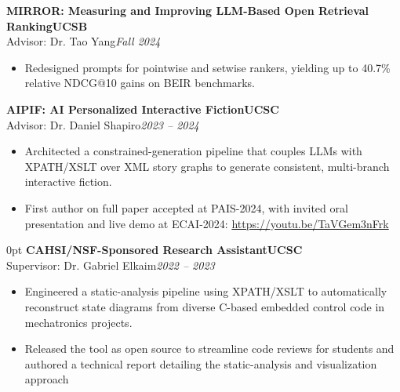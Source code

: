 \documentclass[11pt]{article}
\newlength{\sectionwidth}
\newcommand{\CVSection}[2]{%
  \vspace{1.4em} 
  \noindent
  \makebox[0pt][l]{%
    \parbox[t]{\sectionwidth}{%
      \raggedright\scshape\bfseries\small #1%
    }%
  }%
  \begin{adjustwidth}{\sectionwidth}{0pt}
    #2
  \end{adjustwidth}
}
\newcommand{\CVEntry}[4]{%
  \vspace{0.4em} %
  {\bfseries #1}\hfill {\bfseries #2}\\[0.1em] 
  #3\hfill \textit{#4}
}
\begin{document}
{\begin{itemize}
  \end{itemize}
  \vspace{0.4em}
\CVEntry
    {MIRROR: Measuring and Improving LLM-Based Open Retrieval Ranking}
    {UCSB}
    {Advisor: Dr. Tao Yang}
    {Fall 2024}
  \begin{itemize}
    \item Redesigned prompts for pointwise and setwise rankers, yielding up to 40.7\% relative NDCG@10 gains on BEIR benchmarks.
  \end{itemize}
  \vspace{0.4em}
\CVEntry
    {AIPIF: AI Personalized Interactive Fiction}
    {UCSC}
    {Advisor: Dr. Daniel Shapiro}
    {2023 -- 2024}
  \begin{itemize}
    \item Architected a constrained-generation pipeline that couples LLMs with XPATH/XSLT over XML story graphs to generate consistent, multi-branch interactive fiction.
    \item First author on full paper accepted at PAIS-2024, with invited oral presentation and live demo at ECAI-2024: \href{https://youtu.be/TaVGem3nFrk}{https://youtu.be/TaVGem3nFrk}
  \end{itemize}
}

\CVSection{Experience}{%
\CVEntry
    {CAHSI/NSF-Sponsored Research Assistant}
    {UCSC}
    {Supervisor: Dr. Gabriel Elkaim}
    {2022 -- 2023}
  \begin{itemize}
    \item Engineered a static-analysis pipeline using XPATH/XSLT to automatically reconstruct state diagrams from diverse C-based embedded control code in mechatronics projects.
    \item Released the tool as open source to streamline code reviews for students and authored a technical report detailing the static-analysis and visualization approach
  \end{itemize}
}
\end{document}
